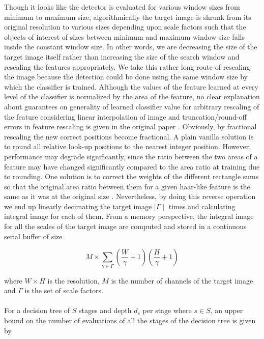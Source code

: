 Though it looks like the detector is evaluated for various window sizes from minimum to maximum size, algorithmically the target image is shrunk from its original resolution to various sizes depending upon scale factors such that the objects of interest of sizes between minimum and maximum window size falls inside the constant window size. In other words, we are decreasing the size of the target image itself rather than increasing the size of the search window and rescaling the features appropriately. We take this rather long route of rescaling the image because the detection could be done using the same window size by which the classifier is trained. Although the values of the feature learned at every level of the classifier is normalized by the area of the feature, no clear explanation about guarantees on generality of learned classifier value for arbitrary rescaling of the feature considering linear interpolation of image and truncation/round-off errors in feature rescaling is given in the original paper \cite{violajones}. Obviously, by fractional rescaling the new correct positions become fractional. A plain vanilla solution is to round all relative look-up positions to the nearest integer position. However, performance may degrade significantly, since the ratio between the two areas of a feature may have changed significantly compared to the area ratio at training due to rounding. One solution is to correct the weights of the different rectangle sums so that the original area ratio between them for a given haar-like feature is the same as it was at the original size \cite{classifier4}. Nevertheless, by doing this reverse operation we end up linearly decimating the target image $\mid \Gamma \mid$ times and calculating integral image for each of them. From a memory perspective, the integral image for all the scales of the target image are computed and stored in a continuous serial buffer of size

$$ M \times \sum_{\gamma \in \Gamma} \left ( \frac{W}{\gamma} + 1 \right ) \left ( \frac{H}{\gamma} + 1  \right ) $$

where $W \times H$ is the resolution, $M$ is the number of channels of the target image and $\Gamma$ is the set of scale factors.

\paragraph{}
For a decision tree of $S$ stages and depth $d_s$ per stage where $s \in S$, an upper bound on the number of evaluations of all the stages of the decision tree is given by 

